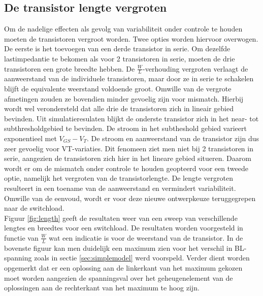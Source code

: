 \subsection{De transistor lengte vergroten}\label{sec:finaleload}
Om de nadelige effecten als gevolg van variabiliteit onder controle te houden moeten de transistoren vergroot worden. Twee opties worden hiervoor overwogen. De eerste is het toevoegen van een derde transistor in serie. Om dezelfde lastimpedantie te bekomen als voor 2 transistoren in serie, moeten de drie transistoren een grote breedte hebben. De $\frac{W}{L}$-verhouding vergroten verlaagt de aanweerstand van de individuele transistoren, maar door ze in serie te schakelen blijft de equivalente weerstand voldoende groot. Omwille van de vergrote afmetingen zouden ze bovendien minder gevoelig zijn voor mismatch. Hierbij wordt wel verondersteld dat alle drie de transistoren zich in lineair gebied bevinden. Uit simulatieresulaten blijkt de onderste transistor zich in het near- tot subthresholdgebied te bevinden. De stroom in het subtheshold gebied varieert exponentieel met $V_{GS}-V_{T}$. De stroom en aanweerstand van de transistor zijn dus zeer gevoelig voor VT-variaties. Dit fenomeen ziet men niet bij 2 transistoren in serie, aangezien de transistoren zich hier in het lineare gebied situeren. Daarom wordt er om de mismatch onder controle te houden geopteerd voor een tweede optie, namelijk het vergroten van de transistorlengte. De lengte vergroten resulteert in een toename van de aanweerstand en vermindert variabiliteit. Omwille van de eenvoud, wordt er voor deze nieuwe ontwerpkeuze teruggegrepen naar de switchload.\\
Figuur \ref{fig:length} geeft de resultaten weer van een sweep van verschillende lengtes en breedtes voor een switchload. De resultaten worden voorgesteld in functie van $\frac{W}{L}$ wat een indicatie is voor de weerstand van de transistor. In de bovenste figuur kan men duidelijk een maximum zien voor het verschil in BL-spanning zoals in sectie \ref{sec:simplemodel} werd voorspeld. Verder dient worden opgemerkt dat er een oplossing aan de linkerkant van het maximum gekozen moet worden aangezien de spanningsval over het geheugenelement van de oplossingen aan de rechterkant van het maximum te hoog zijn.
